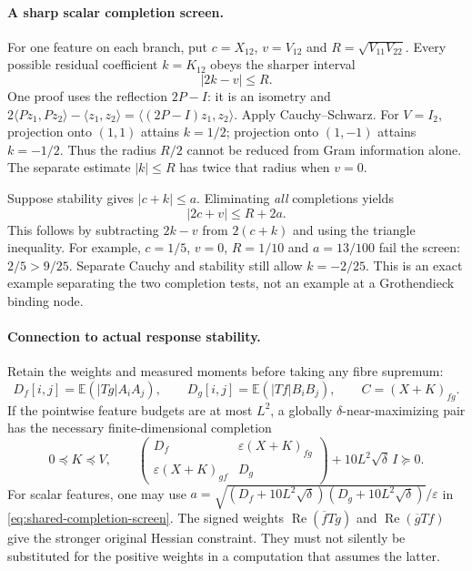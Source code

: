 \paragraph{A sharp scalar completion screen.}
For one feature on each branch, put $c=X_{12}$,
$v=V_{12}$ and $R=\sqrt{V_{11}V_{22}}$. Every possible residual coefficient
$k=K_{12}$ obeys the sharper interval
\begin{equation}\label{eq:shared-cross-interval}
 \boxed{|2k-v|\le R.}
\end{equation}
One proof uses the reflection $2P-I$: it is an isometry and
$2\langle Pz_1,Pz_2\rangle-\langle z_1,z_2\rangle
=\langle(2P-I)z_1,z_2\rangle$. Apply Cauchy--Schwarz.
For $V=I_2$, projection onto $(1,1)$ attains $k=1/2$; projection onto
$(1,-1)$ attains $k=-1/2$. Thus the radius $R/2$ cannot be reduced from
Gram information alone. The separate estimate $|k|\le R$ has twice that radius
when $v=0$.

Suppose stability gives $|c+k|\le a$. Eliminating \emph{all} completions yields
\begin{equation}\label{eq:shared-completion-screen}
 \boxed{|2c+v|\le R+2a.}
\end{equation}
This follows by subtracting $2k-v$ from $2(c+k)$ and using the triangle
inequality. For example, $c=1/5$, $v=0$, $R=1/10$ and $a=13/100$ fail
the screen: $2/5>9/25$. Separate Cauchy and stability still allow $k=-2/25$.
This is an exact example separating the two completion tests, not an example
at a Grothendieck binding node.

\paragraph{Connection to actual response stability.}
Retain the weights and measured moments before taking any fibre supremum:
\[
 D_f[i,j]=\mathbb E(|Tg|A_iA_j),\qquad
 D_g[i,j]=\mathbb E(|Tf|B_iB_j),\qquad
 C=(X+K)_{fg}.
\]
If the pointwise feature budgets are at most $L^2$, a globally
$\delta$-near-maximizing pair has the necessary finite-dimensional completion
\begin{equation}\label{eq:shared-stability-completion}
 0\preceq K\preceq V,\qquad
 \begin{pmatrix}D_f&\varepsilon(X+K)_{fg}\\
 \varepsilon(X+K)_{gf}&D_g\end{pmatrix}
       +10L^2\sqrt\delta\,I\succeq0.
\end{equation}
For scalar features, one may use
$a=\sqrt{(D_f+10L^2\sqrt\delta)(D_g+10L^2\sqrt\delta)}/\varepsilon$
in \eqref{eq:shared-completion-screen}. The signed weights
$\operatorname{Re}(\overline f Tg)$ and
$\operatorname{Re}(\overline g Tf)$ give the stronger original Hessian
constraint. They must not silently be substituted for the positive weights
in a computation that assumes the latter.

